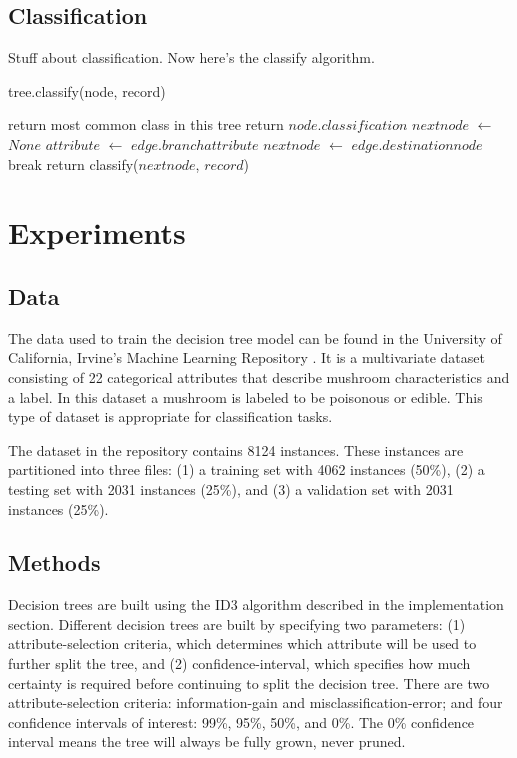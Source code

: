 \documentclass{IEEEtran}
\begin{document}
\subsection{Classification}
Stuff about classification. Now here's the classify algorithm.
\begin{algorithm}
\caption{tree.classify(node, record)}
\begin{algorithmic}
  \State return most common class in this tree
\EndIf
{}
  \State return $node.classification$
\EndIf
\State $nextnode$ $\leftarrow$ $None$
  \State $attribute$ $\leftarrow$ $edge.branchattribute$
    \State $nextnode$ $\leftarrow$ $edge.destinationnode$
    \State break
  \EndIf
\EndFor
\State return classify($nextnode$, $record$)
\end{algorithmic}
\end{algorithm}

\section{Experiments}
\subsection{Data}
The data used to train the decision tree model can be found in the
University of California, Irvine's Machine Learning
Repository \parencite{schlimmer1981mushroom}. It is a multivariate dataset
consisting of 22 categorical attributes that describe mushroom
characteristics and a label. In this dataset a mushroom is labeled to
be poisonous or edible. This type of dataset is appropriate for
classification tasks.

The dataset in the repository contains 8124 instances. These instances
are partitioned into three files: (1) a training set with 4062 instances
(50\%), (2) a testing set with 2031 instances (25\%), and (3) a
validation set with 2031 instances (25\%).

\subsection{Methods}
Decision trees are built using the ID3 algorithm described in the
implementation section. Different decision trees are built by
specifying two parameters: (1) attribute-selection criteria, which
determines which attribute will be used to further split the tree, and (2)
confidence-interval, which specifies how much certainty is required before
continuing to split the decision tree.  There are two
attribute-selection criteria: information-gain and
misclassification-error; and four confidence intervals of interest:
99\%,  95\%, 50\%, and 0\%. The 0\% confidence interval means the tree
will always be fully grown, never pruned.
\end{document}
